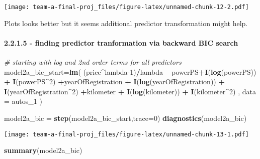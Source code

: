 \documentclass[]{article}
\newenvironment{Shaded}{\begin{snugshade}}{\end{snugshade}}
\newcommand{\CommentTok}[1]{\textcolor[rgb]{0.56,0.35,0.01}{\textit{#1}}}
\newcommand{\DataTypeTok}[1]{\textcolor[rgb]{0.13,0.29,0.53}{#1}}
\newcommand{\DecValTok}[1]{\textcolor[rgb]{0.00,0.00,0.81}{#1}}
\newcommand{\KeywordTok}[1]{\textcolor[rgb]{0.13,0.29,0.53}{\textbf{#1}}}
\newcommand{\NormalTok}[1]{#1}
\newcommand{\OperatorTok}[1]{\textcolor[rgb]{0.81,0.36,0.00}{\textbf{#1}}}
\newcommand{\StringTok}[1]{\textcolor[rgb]{0.31,0.60,0.02}{#1}}
\let\oldparagraph\paragraph
\renewcommand{\paragraph}[1]{\oldparagraph{#1}\mbox{}}
\begin{document}
\texttt{[image: team-a-final-proj\_files/figure-latex/unnamed-chunk-12-2.pdf]}

Plots looks better but it seems additional predictor transformation
might help.

\hypertarget{finding-predictor-tranformation-via-backward-bic-search}{%
\paragraph{2.2.1.5 - finding predictor tranformation via backward BIC
search}\label{finding-predictor-tranformation-via-backward-bic-search}}

\begin{Shaded}
\begin{Highlighting}[]
\CommentTok{# starting with log and 2nd order terms for all predictors}
\NormalTok{model2a_bic_start=}\KeywordTok{lm}\NormalTok{( (price}\OperatorTok{^}\NormalTok{lambda}\DecValTok{-1}\NormalTok{)}\OperatorTok{/}\NormalTok{lambda }\OperatorTok{~}\StringTok{ }\NormalTok{powerPS}\OperatorTok{+}\KeywordTok{I}\NormalTok{(}\KeywordTok{log}\NormalTok{(powerPS)) }\OperatorTok{+}\StringTok{ }\KeywordTok{I}\NormalTok{(powerPS}\OperatorTok{^}\DecValTok{2}\NormalTok{)}
                        \OperatorTok{+}\NormalTok{yearOfRegistration }\OperatorTok{+}\StringTok{ }\KeywordTok{I}\NormalTok{(}\KeywordTok{log}\NormalTok{(yearOfRegistration)) }\OperatorTok{+}\StringTok{ }\KeywordTok{I}\NormalTok{(yearOfRegistration}\OperatorTok{^}\DecValTok{2}\NormalTok{) }
                        \OperatorTok{+}\NormalTok{kilometer }\OperatorTok{+}\StringTok{ }\KeywordTok{I}\NormalTok{(}\KeywordTok{log}\NormalTok{(kilometer)) }\OperatorTok{+}\StringTok{ }\KeywordTok{I}\NormalTok{(kilometer}\OperatorTok{^}\DecValTok{2}\NormalTok{)}
\NormalTok{                      , }\DataTypeTok{data =}\NormalTok{ autos_}\DecValTok{1}\NormalTok{ )}
  



\NormalTok{model2a_bic =}\StringTok{ }\KeywordTok{step}\NormalTok{(model2a_bic_start,}\DataTypeTok{trace=}\DecValTok{0}\NormalTok{)}
\KeywordTok{diagnostics}\NormalTok{(model2a_bic)}
\end{Highlighting}
\end{Shaded}

\texttt{[image: team-a-final-proj\_files/figure-latex/unnamed-chunk-13-1.pdf]}

\begin{Shaded}
\begin{Highlighting}[]
\KeywordTok{summary}\NormalTok{(model2a_bic)}
\end{Highlighting}
\end{Shaded}
\end{document}
